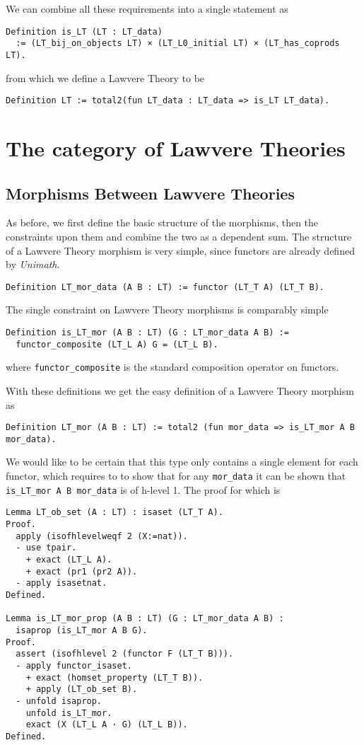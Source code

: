 We can combine all these requirements into a single statement as
\begin{lstlisting}
Definition is_LT (LT : LT_data)
  := (LT_bij_on_objects LT) × (LT_L0_initial LT) × (LT_has_coprods LT).
\end{lstlisting}
from which we define a Lawvere Theory to be
\begin{lstlisting}
Definition LT := total2(fun LT_data : LT_data => is_LT LT_data).
\end{lstlisting}

\section{The category of Lawvere Theories}
\subsection{Morphisms Between Lawvere Theories}
As before, we first define the basic structure of the morphisms, then the
constraints upon them and combine the two as a dependent sum. The structure of a
Lawvere Theory morphism is very simple, since functors are already defined by
\textit{Unimath}.
\begin{lstlisting}
Definition LT_mor_data (A B : LT) := functor (LT_T A) (LT_T B).
\end{lstlisting}

The single constraint on Lawvere Theory morphisms is comparably simple
\begin{lstlisting}
Definition is_LT_mor (A B : LT) (G : LT_mor_data A B) := 
  functor_composite (LT_L A) G = (LT_L B).
\end{lstlisting}
where \verb|functor_composite| is the standard composition operator on functors.

With these definitions we get the easy definition of a Lawvere Theory morphism
as
\begin{lstlisting}
Definition LT_mor (A B : LT) := total2 (fun mor_data => is_LT_mor A B mor_data).
\end{lstlisting}

We would like to be certain that this type only contains a single element for
each functor, which requires to to show that for any \verb|mor_data| it can be
shown that \verb|is_LT_mor A B mor_data| is of h-level 1. The proof for which is
\begin{lstlisting}
Lemma LT_ob_set (A : LT) : isaset (LT_T A).
Proof.
  apply (isofhlevelweqf 2 (X:=nat)).
  - use tpair.
    + exact (LT_L A).
    + exact (pr1 (pr2 A)).
  - apply isasetnat.
Defined.

Lemma is_LT_mor_prop (A B : LT) (G : LT_mor_data A B) : 
  isaprop (is_LT_mor A B G).
Proof.
  assert (isofhlevel 2 (functor F (LT_T B))).
  - apply functor_isaset.
    + exact (homset_property (LT_T B)).
    + apply (LT_ob_set B).
  - unfold isaprop.
    unfold is_LT_mor.
    exact (X (LT_L A · G) (LT_L B)).
Defined.
\end{lstlisting}

